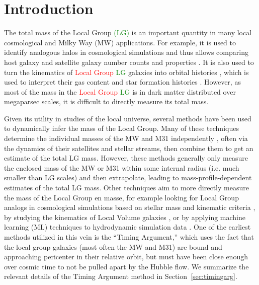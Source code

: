 \documentclass[twocolumn]{aastex631}
\newcommand{\remove}[1]{\textcolor{red}{#1}}
\newcommand{\add}[1]{\textcolor{green}{#1}}
\begin{document}
\section{Introduction}
\label{sec:intro}
The total mass of the Local Group \add{(LG)} is an important quantity in many
local cosmological and Milky Way (MW) applications.
For example, it is used to identify analogous halos in cosmological simulations
and thus allows comparing host galaxy and satellite galaxy number counts and
properties \citep[e.g.,][]{Patel2017a, Marinacci:2017, Dooley2017, Besla2018,
Patel2018, Garrison-Kimmel:2019a, Garrison-Kimmel:2019b, Sawala2022}.
It is also used to turn the kinematics of \remove{Local Group} \add{LG}
galaxies into orbital histories \citep[e.g.,][]{Peebles:2017}, which is used to
interpret their gas content \citep[e.g.,][]{Fillingham:2018,Putman:2021} and
star formation histories \citep[e.g.,][]{Tolstoy:2009}.
However, as most of the mass in the \remove{Local Group} \add{LG} is in dark
matter distributed over megaparsec scales, it is difficult to directly measure
its total mass.

Given its utility in studies of the local universe, several methods have been
used to dynamically infer the mass of the Local Group.
Many of these techniques determine the individual masses of the MW and M31
independently \citep[e.g.][]{Watkins2010, Fardal2013,Diaz2014,Carlesi2017,
Patel2018, Eadie:2019, Fritz:2020, Deason:2021, Villanueva-Domingo2021,
Wang:2022}, often via the dynamics of their satellites
and stellar streams, then combine them to get an estimate of the total LG mass.
However, these methods generally only measure the enclosed mass of the MW or M31
within some internal radius (i.e. much smaller than LG scales) and then
extrapolate, leading to mass-profile-dependent estimates of the total LG mass.
Other techniques aim to more directly measure the mass of the Local Group en
masse, for example looking for Local Group analogs in cosmological simulations
based on stellar mass and kinematic criteria
\citep[e.g.,][]{LiWhite2008, Gonzalez2014, Hartl2021, Zhai2020},
by studying the kinematics of Local Volume galaxies
\citep[e.g.,][]{Diaz2014,Penarrubia2014}, or by applying machine learning (ML)
techniques to hydrodynamic simulation data
\citep[e.g.,][]{McLeod2017,Villanueva-Domingo2021}.
One of the earliest methods utilized in this vein is the ``Timing Argument,''
which uses the fact that the local group galaxies (most often the MW and M31)
are bound and approaching pericenter in their relative orbit, but must have been
close enough over cosmic time to not be pulled apart by the Hubble flow. We
summarize the relevant details of the Timing Argument method in
Section~\ref{sec:timingarg}.
\end{document}

